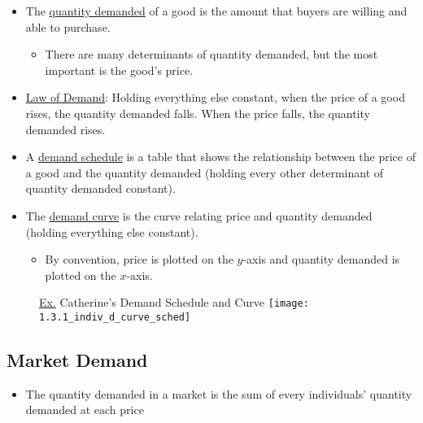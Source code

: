 	\begin{itemize}

	\item The \underline{quantity demanded} of a good is the amount that buyers are willing and able to purchase.
	
		\begin{itemize}
		
		\item There are many determinants of quantity demanded, but the most important is the good's price.
		
		\end{itemize}
		
	\item \underline{Law of Demand}: Holding everything else constant, when the price of a good rises, the quantity demanded falls. When the price falls, the quantity demanded rises.
	
	\item A \underline{demand schedule} is a table that shows the relationship between the price of a good and the quantity demanded (holding every other determinant of quantity demanded constant).
	
	\item The \underline{demand curve} is the curve relating price and quantity demanded (holding everything else constant).
	
		\begin{itemize}
		
		\item By convention, price is plotted on the $y$-axis and quantity demanded is plotted on the $x$-axis.
		
		\end{itemize}

	\end{itemize}
	
	\begin{figure}[h]
	\underline{Ex.} Catherine's Demand Schedule and Curve
	\centering
	\texttt{[image: 1.3.1\_indiv\_d\_curve\_sched]}
	\end{figure}
	
\subsection{Market Demand}

	\begin{itemize}
	
	\item The quantity demanded in a market is the sum of every individuals' quantity demanded at each price
	
	\end{itemize}
	
